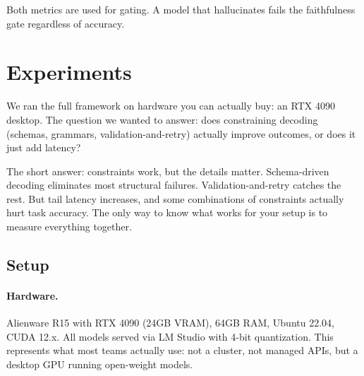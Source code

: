 \documentclass[11pt]{article}
\begin{document}
Both metrics are used for gating.
A model that hallucinates fails the faithfulness gate regardless of accuracy.


\section{Experiments}
\label{sec:experiments}

We ran the full framework on hardware you can actually buy: an RTX 4090 desktop.
The question we wanted to answer: does constraining decoding (schemas, grammars, validation-and-retry) actually improve outcomes, or does it just add latency?

The short answer: constraints work, but the details matter.
Schema-driven decoding eliminates most structural failures.
Validation-and-retry catches the rest.
But tail latency increases, and some combinations of constraints actually hurt task accuracy.
The only way to know what works for your setup is to measure everything together.

\subsection{Setup}

\paragraph{Hardware.}
Alienware R15 with RTX 4090 (24GB VRAM), 64GB RAM, Ubuntu 22.04, CUDA 12.x.
All models served via LM Studio with 4-bit quantization.
This represents what most teams actually use: not a cluster, not managed APIs, but a desktop GPU running open-weight models.
\end{document}

